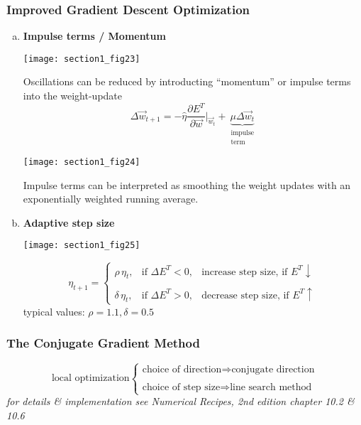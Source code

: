 
\subsubsection{Improved Gradient Descent Optimization}
\begin{enumerate}[(a)]
\item \textbf{Impulse terms / Momentum}
  \begin{center} \texttt{[image: section1\_fig23]} \end{center}
  Oscillations can be reduced by introducting ``momentum'' or impulse terms into the weight-update 
  \begin{equation}
    \Delta \vec{w}_{t + 1} = -\hat{\eta} \frac{\partial E^T}{
      \partial \vec{w}}\bigg|_{\vec{w}_t} + 
    \underbrace{\mu \Delta \vec{w}_t}_{
      \substack{\text{impulse} \\
        \text{term}}}
  \end{equation}
  \begin{center} \texttt{[image: section1\_fig24]} \end{center}
  Impulse terms can be interpreted as smoothing the weight updates
  with an exponentially weighted running average.
\item \textbf{Adaptive step size}
  \begin{center} \texttt{[image: section1\_fig25]} \end{center}
  \[ \eta_{t + 1} = \left \{ 
    \begin{array}{lll}
      \rho \, \eta_t, 
      & \text{if } \Delta E^T < 0,
      & \text{increase step size, if } E^T \downarrow \\\\
      \delta \, \eta_t, 
      & \text{if } \Delta E^T > 0,
      & \text{decrease step size, if } E^T \uparrow 
    \end{array} \right.
  \]
  typical values: $\rho = 1.1, \delta = 0.5$
\end{enumerate}

\subsubsection{The Conjugate Gradient Method}
\[ \text{local optimization} \left \{
	\begin{array}{l}
		\text{choice of direction} \Rightarrow 
			\text{conjugate direction} \\\\
		\text{choice of step size} \Rightarrow
			\text{line search method}
	\end{array} \right.
\]
{\it for details \& implementation see Numerical Recipes, 2nd edition chapter 10.2 \& 10.6}

